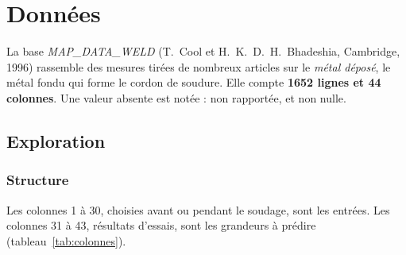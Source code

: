 \section{Données}\label{sec:donnees}

La base \emph{MAP\_DATA\_WELD} (T.~Cool et H.~K.~D.~H.~Bhadeshia, Cambridge, 1996)
rassemble des mesures tirées de nombreux articles sur le \emph{métal déposé}, le métal
fondu qui forme le cordon de soudure. Elle compte \textbf{1652 lignes et 44 colonnes}.
Une valeur absente est notée  : non rapportée, et non nulle.


\subsection{Exploration}\label{sec:exploration}

\subsubsection{Structure}

Les colonnes 1 à 30, choisies avant ou pendant le soudage, sont les entrées. Les
colonnes 31 à 43, résultats d'essais, sont les grandeurs à prédire
(tableau~\ref{tab:colonnes}).

